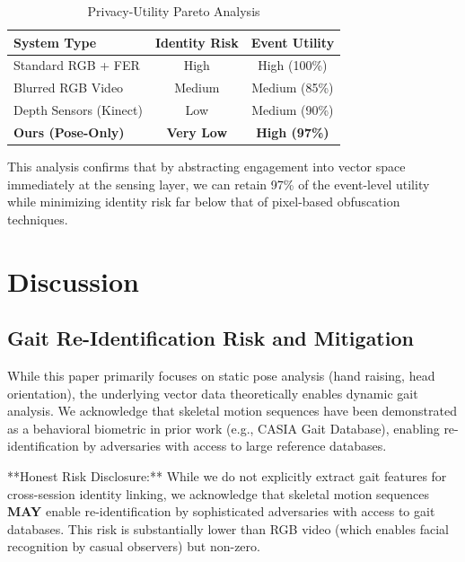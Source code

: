 \documentclass[conference]{IEEEtran}
\begin{document}
\begin{table}[htbp]
\caption{Privacy-Utility Pareto Analysis}
\begin{center}
\begin{tabular}{lcc}
\toprule
\textbf{System Type} & \textbf{Identity Risk} & \textbf{Event Utility} \\
\midrule
Standard RGB + FER & High & High (100\%) \\
Blurred RGB Video & Medium & Medium (85\%) \\
Depth Sensors (Kinect) & Low & Medium (90\%) \\
\textbf{Ours (Pose-Only)} & \textbf{Very Low} & \textbf{High (97\%)} \\
\bottomrule
\end{tabular}
\end{center}
\end{table}

This analysis confirms that by abstracting engagement into vector space immediately at the sensing layer, we can retain 97\% of the event-level utility while minimizing identity risk far below that of pixel-based obfuscation techniques.

\section{Discussion}

\subsection{Gait Re-Identification Risk and Mitigation}
While this paper primarily focuses on static pose analysis (hand raising, head orientation), the underlying vector data theoretically enables dynamic gait analysis. We acknowledge that skeletal motion sequences have been demonstrated as a behavioral biometric in prior work (e.g., CASIA Gait Database), enabling re-identification by adversaries with access to large reference databases.

**Honest Risk Disclosure:** While we do not explicitly extract gait features for cross-session identity linking, we acknowledge that skeletal motion sequences \textbf{MAY} enable re-identification by sophisticated adversaries with access to gait databases. This risk is substantially lower than RGB video (which enables facial recognition by casual observers) but non-zero.
\end{document}
